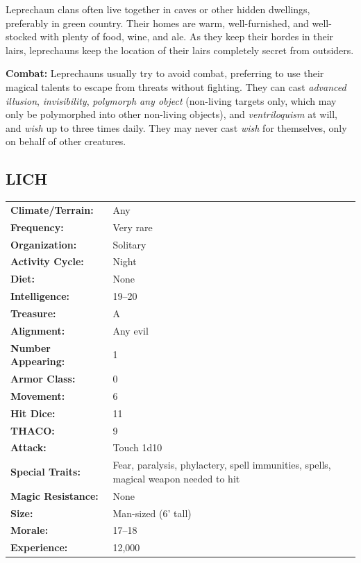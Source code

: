 \begin{multicols}{2}
Leprechaun clans often live together in caves or other hidden dwellings, preferably in green country. Their homes are warm, well-furnished, and well-stocked with plenty of food, wine, and ale. As they keep their hordes in their lairs, leprechauns keep the location of their lairs completely secret from outsiders.

\textbf{Combat:} Leprechauns usually try to avoid combat, preferring to use their magical talents to escape from threats without fighting. They can cast \textit{advanced illusion}, \textit{invisibility}, \textit{polymorph any object} (non-living targets only, which may only be polymorphed into other non-living objects), and \textit{ventriloquism} at will, and \textit{wish} up to three times daily. They may never cast \textit{wish} for themselves, only on behalf of other creatures.

\columnbreak

\noindent
\begin{minipage}{\columnwidth}

\vspace{1em}

\subsection{LICH}

\noindent \begin{tabular}{p{}p{}}
\textbf{Climate/Terrain:}	& Any	\\
\textbf{Frequency:} 		& Very rare	\\
\textbf{Organization:} 		& Solitary	\\
\textbf{Activity Cycle:} 	& Night	\\
\textbf{Diet:} 				& None	\\
\textbf{Intelligence:} 		& 19--20	\\
\textbf{Treasure:} 			& A	\\
\textbf{Alignment:} 		& Any evil	\\
\hline
\textbf{Number Appearing:} 	& 1	\\
\textbf{Armor Class:} 		& 0	\\
\textbf{Movement:} 			& 6	\\
\textbf{Hit Dice:} 			& 11	\\
\textbf{THACO:} 			& 9	\\
\textbf{Attack:} 			& Touch 1d10	\\
\textbf{Special Traits:} & Fear, paralysis, phylactery, spell immunities, spells, magical weapon needed to hit	\\
\textbf{Magic Resistance:} 	& None	\\
\textbf{Size:} 				& Man-sized (6' tall)	\\
\textbf{Morale:} 			& 17--18	\\
\textbf{Experience:} 		& 12,000	\\ %
\end{tabular}


\end{minipage}
\end{multicols}
